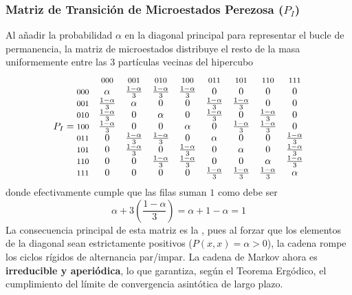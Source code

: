 \subsubsection{Matriz de Transición de Microestados Perezosa ($P_I$)}
\noindent
Al añadir la probabilidad $\alpha$ en la diagonal principal para representar el bucle de permanencia, la matriz de microestados distribuye el resto de la masa uniformemente entre las 3 partículas vecinas del hipercubo
\[
P_I = \begin{matrix}
    & \text{\footnotesize 000} & \text{\footnotesize 001} & \text{\footnotesize 010} & \text{\footnotesize 100} & \text{\footnotesize 011} & \text{\footnotesize 101} & \text{\footnotesize 110} & \text{\footnotesize 111} \\
    \text{\footnotesize 000} & \alpha & \frac{1-\alpha}{3} & \frac{1-\alpha}{3} & \frac{1-\alpha}{3} & 0 & 0 & 0 & 0 \\
    \text{\footnotesize 001} & \frac{1-\alpha}{3} & \alpha & 0 & 0 & \frac{1-\alpha}{3} & \frac{1-\alpha}{3} & 0 & 0 \\
    \text{\footnotesize 010} & \frac{1-\alpha}{3} & 0 & \alpha & 0 & \frac{1-\alpha}{3} & 0 & \frac{1-\alpha}{3} & 0 \\
    \text{\footnotesize 100} & \frac{1-\alpha}{3} & 0 & 0 & \alpha & 0 & \frac{1-\alpha}{3} & \frac{1-\alpha}{3} & 0 \\
    \text{\footnotesize 011} & 0 & \frac{1-\alpha}{3} & \frac{1-\alpha}{3} & 0 & \alpha & 0 & 0 & \frac{1-\alpha}{3} \\
    \text{\footnotesize 101} & 0 & \frac{1-\alpha}{3} & 0 & \frac{1-\alpha}{3} & 0 & \alpha & 0 & \frac{1-\alpha}{3} \\
    \text{\footnotesize 110} & 0 & 0 & \frac{1-\alpha}{3} & \frac{1-\alpha}{3} & 0 & 0 & \alpha & \frac{1-\alpha}{3} \\
    \text{\footnotesize 111} & 0 & 0 & 0 & 0 & \frac{1-\alpha}{3} & \frac{1-\alpha}{3} & \frac{1-\alpha}{3} & \alpha
\end{matrix}
\]
donde efectivamente cumple que las filas suman $1$ como debe ser
\begin{equation*}
    \alpha + 3\left(\frac{1-\alpha}{3}\right) = \alpha + 1 - \alpha = 1
\end{equation*}
La consecuencia principal de esta matriz es la , pues al forzar que los elementos de la diagonal sean estrictamente positivos ($P(x,x) = \alpha > 0$), la cadena rompe los ciclos rígidos de alternancia par/impar. La cadena de Markov ahora es \textbf{irreducible y aperiódica}, lo que garantiza, según el Teorema Ergódico, el cumplimiento del límite de convergencia asintótica de largo plazo.



